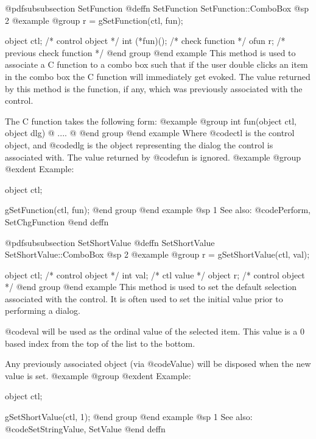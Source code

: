 @pdfsubsubsection {SetFunction}
@deffn {SetFunction} SetFunction::ComboBox
@sp 2
@example
@group
r = gSetFunction(ctl, fun);

object  ctl;      /*  control object           */
int     (*fun)(); /*  check function           */
ofun    r;        /*  previous check function  */
@end group
@end example
This method is used to associate a C function to a combo box such that if
the user double clicks an item in the combo box the C function will
immediately get evoked.  The value returned by this method is the
function, if any, which was previously associated with the control.

The C function takes the following form:
@example
@group
int     fun(object ctl, object dlg)
@{
        ....
@}
@end group
@end example
Where @code{ctl} is the control object, and @code{dlg} is the object
representing the dialog the control is associated with.  The value
returned by @code{fun} is ignored.
@example
@group
@exdent Example:

object  ctl;

gSetFunction(ctl, fun);
@end group
@end example
@sp 1
See also:  @code{Perform, SetChgFunction}
@end deffn






















@pdfsubsubsection {SetShortValue}
@deffn {SetShortValue} SetShortValue::ComboBox
@sp 2
@example
@group
r = gSetShortValue(ctl, val);

object  ctl;    /*  control object  */
int     val;    /*  ctl value       */
object  r;      /*  control object  */
@end group
@end example
This method is used to set the default selection associated with the
control.  It is often used to set the initial value prior to performing
a dialog.

@code{val} will be used as the ordinal value of the selected item.  This
value is a 0 based index from the top of the list to the bottom.

Any previously associated object (via @code{Value}) will be disposed
when the new value is set.
@example
@group
@exdent Example:

object  ctl;

gSetShortValue(ctl, 1);
@end group
@end example
@sp 1
See also:  @code{SetStringValue, SetValue}
@end deffn









